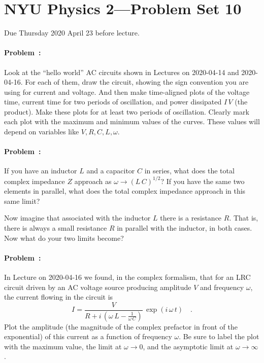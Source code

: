 \documentclass[12pt]{article}
\begin{document}
\section*{NYU Physics 2---Problem Set 10}

Due Thursday 2020 April 23 before lecture.

\paragraph{Problem~\theproblem:}%
Look at the ``hello world'' AC circuits shown in Lectures on
2020-04-14 and 2020-04-16. For each of them, draw the circuit, showing
the sign convention you are using for current and voltage. And then
make time-aligned plots of the voltage  time, current
 time for two periods of oscillation, and power dissipated
$I\,V$ (the product). Make these plots for at least two periods of
oscillation. Clearly mark each plot with the maximum and minimum
values of the curves. These values will depend on variables like $V,
R, C, L, \omega$.

\paragraph{Problem~\theproblem:}%
If you have an inductor $L$ and a capacitor $C$ in series, what does
the total complex impedance $Z$ approach as $\omega\rightarrow
(L\,C)^{1/2}$? If you have the same two elements in parallel, what
does the total complex impedance approach in this same limit?

Now imagine that associated with the inductor $L$ there is a
resistance $R$. That is, there is always a small resistance $R$ in
parallel with the inductor, in both cases. Now what do your two limits
become?

\paragraph{Problem~\theproblem:}%
In Lecture on 2020-04-16 we found, in the complex formalism, that for
an LRC circuit driven by an AC voltage source producing amplitude $V$ and frequency $\omega$, the current flowing in the
circuit is
\begin{equation}\label{eq:res}
  I = \frac{V}{R + i\,\left(\omega\,L - \frac{1}{\omega\,C}\right)}\,\exp(i\,\omega\,t)
  \quad .
\end{equation}
Plot the amplitude (the magnitude of the complex prefactor in front of
the exponential) of this current as a function of frequency
$\omega$. Be sure to label the plot with the maximum value, the limit
at $\omega\rightarrow 0$, and the asymptotic limit at
$\omega\rightarrow\infty$.
\end{document}
